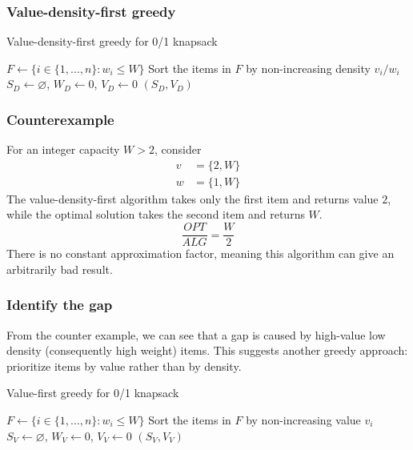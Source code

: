 \documentclass[8pt]{extarticle}
\theoremstyle{definition}
\begin{document}
\begin{multicols*}{2}
\subsubsection*{Value-density-first greedy}

\begin{algorithm}[H]
  \caption{Value-density-first greedy for 0/1 knapsack}
  $F \gets \{i \in \{1,\ldots,n\}:w_i\leq W\}$\;
  Sort the items in $F$ by non-increasing density $v_i/w_i$\;
  $S_D \gets \varnothing$, $W_D \gets 0$, $V_D \gets 0$\;
  \Return $(S_D,V_D)$\;
\end{algorithm}

\subsubsection*{Counterexample}
For an integer capacity $W>2$, consider
\begin{align*}
  v &= \{2, W\}\\
  w &= \{1, W\}
\end{align*}
The value-density-first algorithm takes only the first item and returns value $2$, while the optimal solution takes the second item and returns $W$. 
\[\frac{OPT}{ALG} = \frac{W}{2}\]
There is no constant approximation factor, meaning this algorithm can give an arbitrarily bad result. 
\subsubsection*{Identify the gap}
From the counter example, we can see that a gap is caused by high-value low density (consequently high weight) items. 
This suggests another greedy approach: prioritize items by value rather than by density.


\begin{algorithm}[H]
  \caption{Value-first greedy for 0/1 knapsack}
  $F \gets \{i \in \{1,\ldots,n\}:w_i\leq W\}$\;
  Sort the items in $F$ by non-increasing value $v_i$\;
  $S_V \gets \varnothing$, $W_V \gets 0$, $V_V \gets 0$\;
  \Return $(S_V,V_V)$\;
\end{algorithm}


\end{multicols*}
\end{document}
